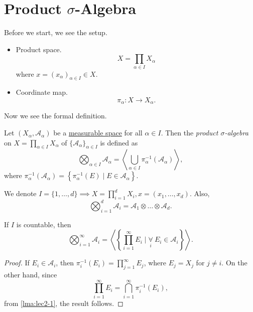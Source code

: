 \section{Product \(\sigma\)-Algebra}
Before we start, we see the setup.
\begin{itemize}
	\item Product space.
	      \[
		      X = \prod_{\alpha \in I} X_\alpha
	      \]
	      where \(x = (x_\alpha )_{\alpha \in I}\in X\).
	\item Coordinate map.
	      \[
		      \pi _\alpha \colon X\to X_\alpha.
	      \]
\end{itemize}

Now we see the formal definition.
\begin{definition}\label{def:product-sigma-algebra}
	Let \((X_\alpha , \mathcal{A} _\alpha )\) be a \hyperref[def:measurable-space]{measurable space} for all \(\alpha \in I\). Then the \emph{product \(\sigma\)-algebra} on \(X = \prod_{\alpha \in I} X_\alpha \) of \(\{ \mathcal{A} _{\alpha } \}_{\alpha \in I}\) is defined as
	\[
		\bigotimes_{\alpha \in I}\mathcal{A} _\alpha = \left< \bigcup_{\alpha \in I} \pi ^{-1} _{\alpha }\left(\mathcal{A} _\alpha \right)  \right>,
	\]
	where \(\pi ^{-1} _\alpha \left(\mathcal{A} _\alpha \right) = \left\{\pi ^{-1} _\alpha (E) \mid E\in \mathcal{A} _\alpha \right\}\).
\end{definition}

\begin{notation}
	We denote \(I = \{1, \dots , d\} \implies X = \prod_{i=1}^{d} X_{i}, x = (x_1, \dots , x_d )\). Also,
	\[
		\bigotimes_{i = 1}^d \mathcal{A} _{i} = \mathcal{A} _1\otimes \dots \otimes \mathcal{A} _d.
	\]
\end{notation}

\begin{lemma}
	If \(I\) is countable, then
	\[
		\bigotimes_{i = 1}^{\infty}\mathcal{A} _{i} = \left< \left\{\prod_{i = 1}^{\infty} E_{i} \mid \underset{i}{\forall }\ E_{i}\in \mathcal{A} _{i}\right\} \right>.
	\]
\end{lemma}
\begin{proof}
	If \(E_i \in \mathcal{A} _{i}\), then \(\pi ^{-1} _{i} (E_{i} ) = \prod_{j=1}^{\infty } E_{j}\), where \(E_{j} = X_j\) for \(j\neq i\). On the other hand, since
	\[
		\prod_{i=1}^{\infty } E_{i} = \bigcap_{i=1}^{\infty } \pi ^{-1} _{i} (E_{i} ),
	\]
	from \autoref{lma:lec2-1}, the result follows.
\end{proof}